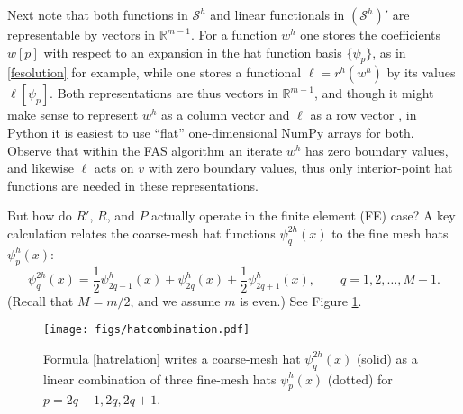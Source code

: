 \documentclass[letterpaper,final,12pt,reqno]{amsart}
\newcommand{\RR}{\mathbb{R}}
\begin{document}
Next note that both functions in $\mathcal{S}^h$ and linear functionals in $(\mathcal{S}^h)'$ are representable by vectors in $\RR^{m-1}$.  For a function $w^h$ one stores the coefficients $w[p]$ with respect to an expansion in the hat function basis $\{\psi_p\}$, as in \eqref{fesolution} for example, while one stores a functional $\ell=r^h(w^h)$ by its values $\ell[\psi_p]$.  Both representations are thus vectors in $\RR^{m-1}$, and though it might make sense to represent $w^h$ as a column vector and $\ell$ as a row vector \cite{TrefethenBau1997}, in Python it is easiest to use ``flat'' one-dimensional NumPy arrays for both.  Observe that within the FAS algorithm an iterate $w^h$ has zero boundary values, and likewise $\ell$ acts on $v$ with zero boundary values, thus only interior-point hat functions are needed in these representations.

But how do $R'$, $R$, and $P$ actually operate in the finite element (FE) case?  A key calculation relates the coarse-mesh hat functions $\psi_q^{2h}(x)$ to the fine mesh hats $\psi_p^h(x)$:
\begin{equation}
  \psi_q^{2h}(x) = \frac{1}{2} \psi_{2q-1}^h(x) + \psi_{2q}^h(x) + \frac{1}{2} \psi_{2q+1}^h(x), \qquad q=1,2,\dots,M-1. \label{hatrelation}
\end{equation}
(Recall that $M=m/2$, and we assume $m$ is even.)  See Figure \ref{fig:hatcombination}.

\begin{figure}
\texttt{[image: figs/hatcombination.pdf]}
\caption{Formula \eqref{hatrelation} writes a coarse-mesh hat $\psi_q^{2h}(x)$ (solid) as a linear combination of three fine-mesh hats $\psi_p^h(x)$ (dotted) for $p=2q-1,2q,2q+1$.}
\label{fig:hatcombination}
\end{figure}
\end{document}
